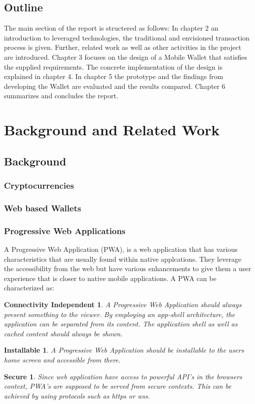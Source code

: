 \documentclass[a4paper]{article}
\begin{document}
\subsection{Outline}
The main section of the report is structered as follows:
In chapter 2 an introduction to leveraged technologies, the traditional and envisioned transaction process is given. Further, related work  as well as other activities in the project are introduced. Chapter 3 focuses on the design of a Mobile Wallet that satisfies the supplied requirements. The concrete implementation of the design is explained in chapter 4. In chapter 5 the prototype and the findings from developing the Wallet are evaluated and the results compared.
Chapter 6 summarizes and concludes the report.
\newpage

\section{Background and Related Work}
\subsection{Background}
\subsubsection{Cryptocurrencies}
\subsubsection{Web based Wallets}
\subsubsection{Progressive Web Applications}
A Progressive Web Application (PWA), is a web application that has various characteristics that are usually found within native applcations.
They leverage the accessibility from the web but have various enhancements to give them a user experience that is closer to native mobile applications.
A PWA can be characterized as:
\newtheorem{theorem}{Connectivity Independent}
\newtheorem{theorem-install}{Installable}
\newtheorem{theorem-secure}{Secure}

\begin{theorem}
A Progressive Web Application should always present something to the viewer. By employing an app-shell architecture, the application can be separated from its content. The application shell as well as cached content should always be shown.
\end{theorem}
\begin{theorem-install}
A Progressive Web Application should be installable to the users home screen and accessible from there.

\end{theorem-install}
\begin{theorem-secure}
Since web application have access to powerful API's in the browsers context, PWA's are supposed to be served from secure contexts. This can be achieved by using protocols such as https or wss.

\end{theorem-secure}
\end{document}

